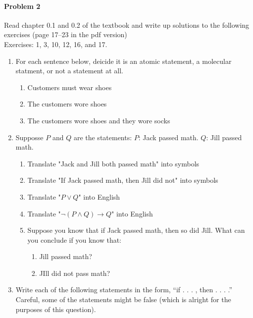 \documentclass[11pt, a4paper]{article}
\begin{document}
\paragraph{Problem 2} Read chapter 0.1 and 0.2 of the textbook and write up solutions to the following exercises (page 17--23 in the pdf version)\\

Exercises: 1, 3, 10, 12, 16, and 17.\

\begin{enumerate}

    \item For each sentence below, deicide it is an atomic statement, a molecular statment, or not a statement at all.
        \begin{enumerate}
            \item Customers must wear shoes
            \item The customers wore shoes
            \item The customers wore shoes and they wore socks
        \end{enumerate}
    \item Supposse $P$ and $Q$ are the statements: $P$: Jack passed math. $Q$: Jill passed math.
        \begin{enumerate}
            \item Translate "Jack and Jill both passed math" into symbols
            \item Translate "If Jack passed math, then Jill did not" into symbols
            \item Translate "$P \lor Q$" into English
            \item Translate "$ \neg(P \land Q) \rightarrow Q$" into English
            \item Suppose you know that if Jack passed math, then so did Jill. What can you conclude if you know that:
                \begin{enumerate}
                    \item Jill passed math?
                    \item JIll did not pass math?
                \end{enumerate}
        \end{enumerate}
    \item Write each of the following statements in the form, “if . . . , then . . . .” Careful, some of the statements might be false (which is alright for the purposes of this question).
        \begin{enumerate}

\end{enumerate}
\end{enumerate}
\end{document}
